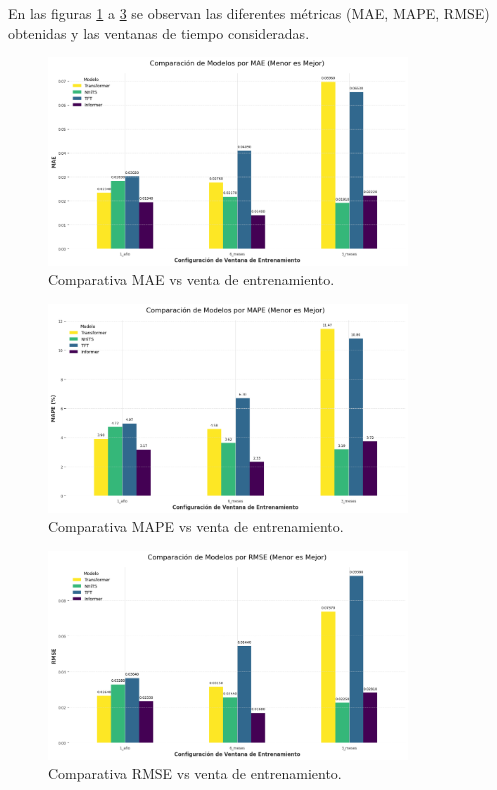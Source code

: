 \documentclass[12pt]{article}
\begin{document}
En las figuras \ref{mae} a \ref{rmse} se observan las diferentes métricas (MAE, MAPE, RMSE) obtenidas y las ventanas de tiempo consideradas.

\begin{figure}[H] 
\centering
\includegraphics[width=0.85\textwidth]{./results/comparacion_modelos_por_MAE.png} 
\caption{Comparativa MAE vs venta de entrenamiento.}
\label{mae}
\end{figure}

\begin{figure}[H] 
\centering
\includegraphics[width=0.85\textwidth]{./results/comparacion_modelos_por_MAPE.png} 
\caption{Comparativa MAPE vs venta de entrenamiento.}
\label{mape}
\end{figure}

\begin{figure}[H] 
\centering
\includegraphics[width=0.85\textwidth]{./results/comparacion_modelos_por_RMSE.png} 
\caption{Comparativa RMSE vs venta de entrenamiento.}
\label{rmse}
\end{figure}
\end{document}
